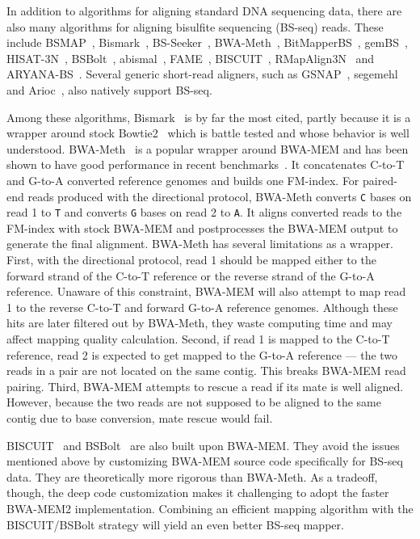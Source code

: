 \documentclass[webpdf,contemporary,large,namedate]{oup-authoring-template}%
\begin{document}
In addition to algorithms for aligning standard DNA sequencing data,
there are also many algorithms for aligning bisulfite sequencing (BS-seq) reads.
These include
BSMAP~\citep{Xi:2009aa},
Bismark~\citep{Krueger:2011aa},
BS-Seeker~\citep{Chen:2010aa,Guo:2013aa,Huang:2018aa},
BWA-Meth~\citep{Pedersen:2014aa},
BitMapperBS~\citep{Cheng:2018aa},
gemBS~\citep{Merkel:2019aa},
HISAT-3N~\citep{Zhang:2021ac},
BSBolt~\citep{Farrell:2021aa},
abismal~\citep{de_Sena_Brandine_2021},
FAME~\citep{Fischer_2023},
BISCUIT~\citep{Zhou:2024ac},
RMapAlign3N~\citep{Muller:2025aa}
and ARYANA-BS~\citep{Nikaein_2025}.
Several generic short-read aligners, such as
GSNAP~\citep{Wu:2010uq},
segemehl~\citep{Otto:2014aa}
and Arioc~\citep{Wilton:2018aa},
also natively support BS-seq.

Among these algorithms, Bismark~\citep{Krueger:2011aa} is by far the most cited,
partly because it is a wrapper around stock Bowtie2~\citep{Langmead:2012fk}
which is battle tested and whose behavior is well understood.
BWA-Meth~\citep{Pedersen:2014aa} is a popular wrapper around BWA-MEM
and has been shown to have good performance in recent benchmarks~\citep{Foox:2021aa,Gong_2022,Kerns_2025,Lin_2025}.
It concatenates C-to-T and G-to-A converted reference genomes and builds one FM-index.
For paired-end reads produced with the directional protocol,
BWA-Meth converts {\tt C} bases on read 1 to {\tt T} and converts {\tt G} bases on read 2 to {\tt A}.
It aligns converted reads to the FM-index with stock BWA-MEM
and postprocesses the BWA-MEM output to generate the final alignment.
BWA-Meth has several limitations as a wrapper.
First, with the directional protocol, read 1 should be mapped either to the forward strand of the C-to-T reference or the reverse strand of the G-to-A reference.
Unaware of this constraint, BWA-MEM will also attempt to map read 1 to the reverse C-to-T and forward G-to-A reference genomes.
Although these hits are later filtered out by BWA-Meth,
they waste computing time and may affect mapping quality calculation.
Second, if read 1 is mapped to the C-to-T reference, read 2 is expected to get mapped to the G-to-A reference
--- the two reads in a pair are not located on the same contig.
This breaks BWA-MEM read pairing.
Third, BWA-MEM attempts to rescue a read if its mate is well aligned.
However, because the two reads are not supposed to be aligned to the same contig due to base conversion,
mate rescue would fail.

BISCUIT~\citep{Zhou:2024ac} and BSBolt~\citep{Farrell:2021aa} are also built upon BWA-MEM.
They avoid the issues mentioned above by customizing BWA-MEM source code specifically for BS-seq data.
They are theoretically more rigorous than BWA-Meth.
As a tradeoff, though, the deep code customization makes it challenging to adopt the faster BWA-MEM2 implementation.
Combining an efficient mapping algorithm with the BISCUIT/BSBolt strategy will yield an even better BS-seq mapper.
\end{document}
